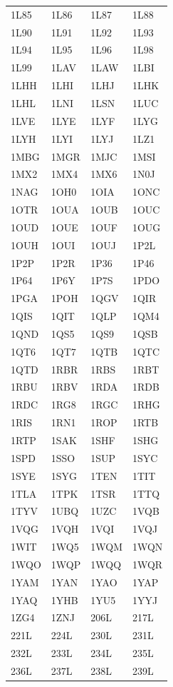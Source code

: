 \begin{longtable}{p{} p{} p{} p{}}
1L85 & 1L86 & 1L87 & 1L88 \\
1L90 & 1L91 & 1L92 & 1L93 \\
1L94 & 1L95 & 1L96 & 1L98 \\
1L99 & 1LAV & 1LAW & 1LBI \\
1LHH & 1LHI & 1LHJ & 1LHK \\
1LHL & 1LNI & 1LSN & 1LUC \\
1LVE & 1LYE & 1LYF & 1LYG \\
1LYH & 1LYI & 1LYJ & 1LZ1 \\
1MBG & 1MGR & 1MJC & 1MSI \\
1MX2 & 1MX4 & 1MX6 & 1N0J \\
1NAG & 1OH0 & 1OIA & 1ONC \\
1OTR & 1OUA & 1OUB & 1OUC \\
1OUD & 1OUE & 1OUF & 1OUG \\
1OUH & 1OUI & 1OUJ & 1P2L \\
1P2P & 1P2R & 1P36 & 1P46 \\
1P64 & 1P6Y & 1P7S & 1PDO \\
1PGA & 1POH & 1QGV & 1QIR \\
1QIS & 1QIT & 1QLP & 1QM4 \\
1QND & 1QS5 & 1QS9 & 1QSB \\
1QT6 & 1QT7 & 1QTB & 1QTC \\
1QTD & 1RBR & 1RBS & 1RBT \\
1RBU & 1RBV & 1RDA & 1RDB \\
1RDC & 1RG8 & 1RGC & 1RHG \\
1RIS & 1RN1 & 1ROP & 1RTB \\
1RTP & 1SAK & 1SHF & 1SHG \\
1SPD & 1SSO & 1SUP & 1SYC \\
1SYE & 1SYG & 1TEN & 1TIT \\
1TLA & 1TPK & 1TSR & 1TTQ \\
1TYV & 1UBQ & 1UZC & 1VQB \\
1VQG & 1VQH & 1VQI & 1VQJ \\
1WIT & 1WQ5 & 1WQM & 1WQN \\
1WQO & 1WQP & 1WQQ & 1WQR \\
1YAM & 1YAN & 1YAO & 1YAP \\
1YAQ & 1YHB & 1YU5 & 1YYJ \\
1ZG4 & 1ZNJ & 206L & 217L \\
221L & 224L & 230L & 231L \\
232L & 233L & 234L & 235L \\
236L & 237L & 238L & 239L \\

\end{longtable}
